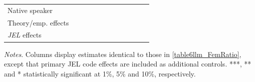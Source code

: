 \begin{table}
\begin{threeparttable}
\begin{tabular}{p{3cm}S@{}S@{}S@{}S@{}S@{}S@{}S@{}S@{}S@{}S@{}S@{}}
            Native speaker                &               &           {}   &               &           {}   &               &           {}   &               &           {}   &               &               &               \\
            Theory/emp. effects           &               &           {}   &               &           {}   &               &           {}   &               &           {}   &               &               &               \\
            \textit{JEL} effects          &               &           {}   &               &           {}   &               &           {}   &               &           {}   &               &               &               \\
            \bottomrule
        \end{tabular}
        \begin{tablenotes}
            \tiny
            \item \textit{Notes}. Columns display estimates identical to those in \autoref{table6llm_FemRatio}, except that primary JEL code effects are included as additional controls. ***, ** and * statistically significant at 1\%, 5\% and 10\%, respectively.
        \end{tablenotes}
    \end{threeparttable}

\end{table}
